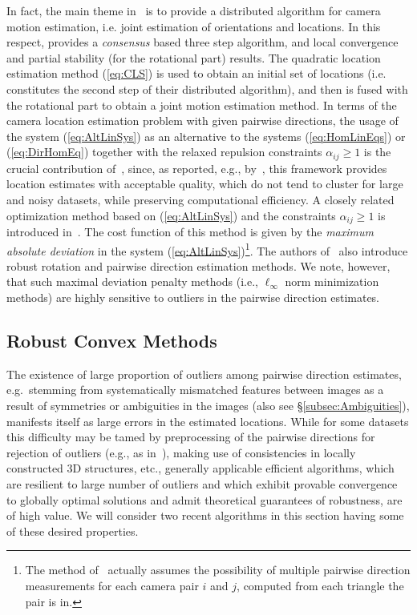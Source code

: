 \documentclass[10pt]{article}
\begin{document}
In fact, the main theme in~\cite{TronVidalJournal} is to provide a distributed algorithm for camera motion estimation, i.e. joint estimation of orientations and locations. In this respect, \cite{TronVidalJournal} provides a \textit{consensus} based three step algorithm, and local convergence and partial stability (for the rotational part) results. The quadratic location estimation method (\ref{eq:CLS}) is used to obtain an initial set of locations (i.e. constitutes the second step of their distributed algorithm), and then is fused with the rotational part to obtain a joint motion estimation method. In terms of the camera location estimation problem with given pairwise directions, the usage of the system (\ref{eq:AltLinSys}) as an alternative to the systems (\ref{eq:HomLinEqs}) or (\ref{eq:DirHomEq}) together with the relaxed repulsion constraints $\alpha_{ij}\geq1$ is the crucial contribution of~\cite{TronVidalJournal}, since, as reported, e.g., by~\cite{LUD}, this framework provides location estimates with acceptable quality, which do not tend to cluster for large and noisy datasets, while preserving computational efficiency. A closely related optimization method based on (\ref{eq:AltLinSys}) and the constraints $\alpha_{ij}\geq1$ is introduced in~\cite{MoulonLinfty}. The cost function of this method is given by the \textit{maximum absolute deviation} in the system (\ref{eq:AltLinSys})\footnote{The method of~\cite{MoulonLinfty} actually assumes the possibility of multiple pairwise direction measurements for each camera pair $i$ and $j$, computed from each triangle the pair is in.}. The authors of~\cite{MoulonLinfty} also introduce robust rotation and pairwise direction estimation methods. We note, however, that such maximal deviation penalty methods (i.e., $\ell_{\infty}$ norm minimization methods) are highly sensitive to outliers in the pairwise direction estimates.

\subsection{Robust Convex Methods}
The existence of large proportion of outliers among pairwise direction estimates, e.g.~stemming from systematically mismatched features between images as a result of symmetries or ambiguities in the images (also see \S\ref{subsec:Ambiguities}), manifests itself as large errors in the estimated locations. While for some datasets this difficulty may be tamed by preprocessing of the pairwise directions for rejection of outliers (e.g., as in~\cite{Snavely1D}), making use of consistencies in locally constructed $3$D structures, etc., generally applicable efficient algorithms, which are resilient to large number of outliers and which exhibit provable convergence to globally optimal solutions and admit theoretical guarantees of robustness, are of high value. We will consider two recent algorithms in this section having some of these desired properties.
\end{document}
